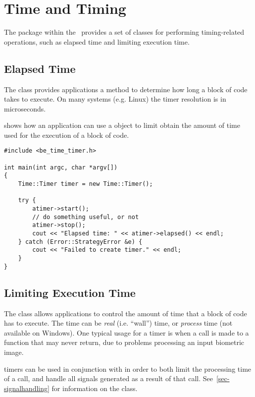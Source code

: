 %
%
\chapter{Time and Timing}
\label{chp-time}

The  package within the \lname\ provides a set of classes for performing
timing-related operations, such as elapsed time and limiting execution time.

\section{Elapsed Time}

The  class provides applications a method to determine how long
a block of code takes to execute. On many systems (e.g. Linux) the timer
resolution is in microseconds.

 shows how an application can use a 
object to limit obtain the amount of time used for the execution of a block
of code.

\begin{lstlisting}[caption={Using the \class{Timer}}, label=timeruse]
#include <be_time_timer.h>

int main(int argc, char *argv[])
{
	Time::Timer timer = new Time::Timer();

	try {
		atimer->start();
		// do something useful, or not
		atimer->stop();
		cout << "Elapsed time: " << atimer->elapsed() << endl;
	} catch (Error::StrategyError &e) {
		cout << "Failed to create timer." << endl;
	}
}
\end{lstlisting}

\section{Limiting Execution Time}

The  class allows applications to control the amount of time
that a block of code has to execute. The time can be {\em real} (i.e. ``wall'')
time, or {\em process} time (not available on Windows). One typical usage for
a  timer is when a call is made to a function that may never return,
due to problems processing an input biometric image.

 timers can be used in conjunction with  in
order to both limit the processing time of a call, and handle all signals
generated as a result of that call. See~\ref{sec-signalhandling} for
information on the  class.

